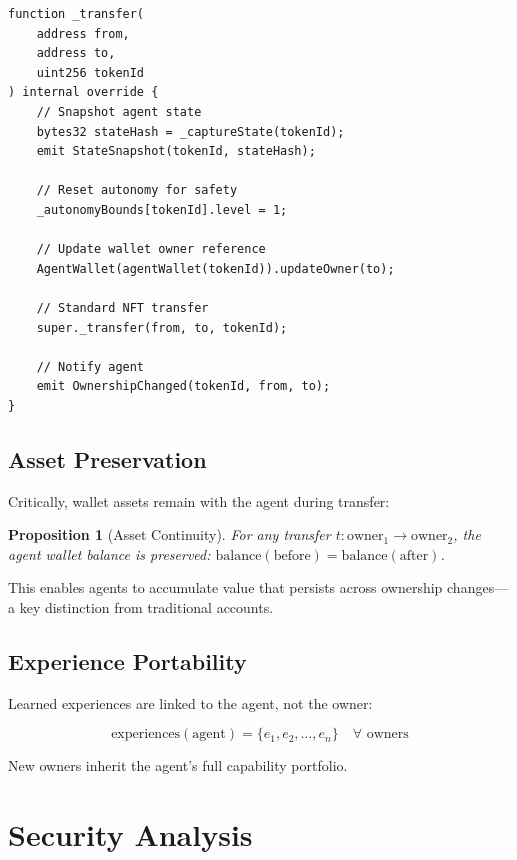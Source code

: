 \documentclass[11pt,letterpaper]{article}
\newtheorem{proposition}[theorem]{Proposition}
\begin{document}
\begin{lstlisting}[style=solidity]
function _transfer(
    address from,
    address to,
    uint256 tokenId
) internal override {
    // Snapshot agent state
    bytes32 stateHash = _captureState(tokenId);
    emit StateSnapshot(tokenId, stateHash);

    // Reset autonomy for safety
    _autonomyBounds[tokenId].level = 1;

    // Update wallet owner reference
    AgentWallet(agentWallet(tokenId)).updateOwner(to);

    // Standard NFT transfer
    super._transfer(from, to, tokenId);

    // Notify agent
    emit OwnershipChanged(tokenId, from, to);
}
\end{lstlisting}

\subsection{Asset Preservation}

Critically, wallet assets remain with the agent during transfer:

\begin{proposition}[Asset Continuity]
For any transfer $t: \text{owner}_1 \to \text{owner}_2$, the agent wallet balance is preserved: $\text{balance}(\text{before}) = \text{balance}(\text{after})$.
\end{proposition}

This enables agents to accumulate value that persists across ownership changes---a key distinction from traditional accounts.

\subsection{Experience Portability}

Learned experiences are linked to the agent, not the owner:

\begin{equation}
\text{experiences}(\text{agent}) = \{e_1, e_2, \ldots, e_n\} \quad \forall \text{ owners}
\end{equation}

New owners inherit the agent's full capability portfolio.

\section{Security Analysis}
\label{sec:security}
\end{document}
